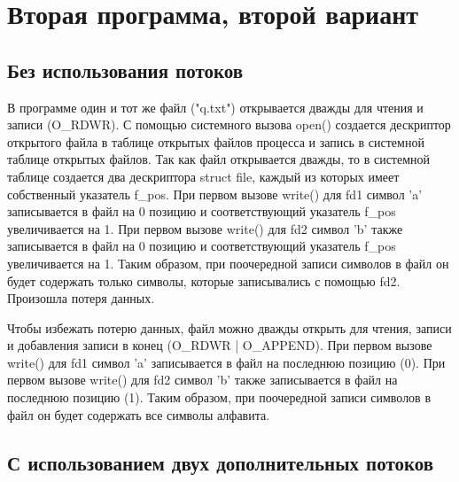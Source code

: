 \clearpage

\section{Вторая программа, второй вариант}

\subsection{Без использования потоков}


\clearpage


В программе один и тот же файл ("q.txt") открывается дважды для чтения и записи (O\_RDWR).
С помощью системного вызова open() создается дескриптор открытого файла в таблице открытых файлов процесса и запись в системной таблице открытых файлов.
Так как файл открывается дважды, то в системной таблице создается два дескриптора struct file, каждый из которых имеет собственный указатель f\_pos.
При первом вызове write() для fd1 символ 'a' записывается в файл на 0 позицию и соответствующий указатель f\_pos увеличивается на 1.
При первом вызове write() для fd2 символ 'b' также записывается в файл на 0 позицию и соответствующий указатель f\_pos увеличивается на 1.
Таким образом, при поочередной записи символов в файл он будет содержать только символы, которые записывались с помощью fd2.
Произошла потеря данных.

Чтобы избежать потерю данных, файл можно дважды открыть для чтения, записи и добавления записи в конец (O\_RDWR | O\_APPEND).
При первом вызове write() для fd1 символ 'a' записывается в файл на последнюю позицию (0).
При первом вызове write() для fd2 символ 'b' также записывается в файл на последнюю позицию (1).
Таким образом, при поочередной записи символов в файл он будет содержать все символы алфавита.

\clearpage

\subsection{С использованием двух дополнительных потоков}



